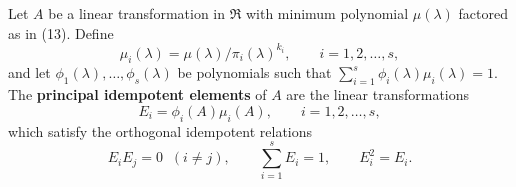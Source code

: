 Let $A$ be a linear transformation in $\Re$ with minimum polynomial $\mu(\lambda)$ factored as in (13). Define
$$
\mu_i(\lambda) = \mu(\lambda) / \pi_i(\lambda)^{k_i}, \qquad i = 1, 2, \dots, s,
$$
and let $\phi_1(\lambda), \dots, \phi_s(\lambda)$ be polynomials such that $\sum_{i=1}^s \phi_i(\lambda)\mu_i(\lambda) = 1$. The \textbf{principal idempotent elements} of $A$ are the linear transformations
$$
E_i = \phi_i(A)\mu_i(A), \qquad i = 1, 2, \dots, s,
$$
which satisfy the orthogonal idempotent relations
$$
E_iE_j = 0 \;\; (i \neq j), \qquad \sum_{i=1}^s E_i = 1, \qquad E_i^2 = E_i.
$$

